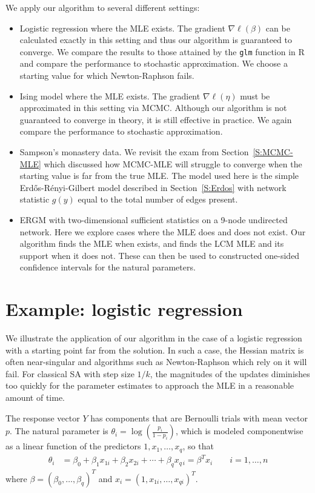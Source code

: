 We apply our algorithm to several different settings:
\begin{itemize}
\item Logistic regression where the MLE exists.  The gradient $\nabla \ell(\beta)$ can be calculated exactly in this setting and thus our algorithm is guaranteed to converge.  We compare the results to those attained by the \texttt{glm} function in R and compare the performance to stochastic approximation.  We choose a starting value for which Newton-Raphson fails.

\item Ising model where the MLE exists.  The gradient $\nabla \ell(\eta)$ must be approximated in this setting via MCMC.  Although our algorithm is not guaranteed to converge in theory, it is still effective in practice.  We again compare the performance to stochastic approximation.

\item Sampson's monastery data.  We revisit the exam from Section~\ref{S:MCMC-MLE} which
discussed how MCMC-MLE will struggle to converge when the starting value is far
from the true MLE.  The model used here is the simple Erd\H{o}s-R\'{e}nyi-Gilbert model 
described in Section~\ref{S:Erdos} with network statistic $g(y)$ equal to the total number of edges present.

\item ERGM with two-dimensional sufficient statistics on a 9-node undirected network.  
Here we explore cases where the MLE does and does not exist.  
Our algorithm finds the MLE when
exists, and finds the LCM MLE and its support when it does not.  These can then
be used to constructed one-sided confidence intervals for the natural parameters.
\end{itemize}

\section{Example: logistic regression}
We illustrate the application of our algorithm in the case of a logistic regression 
with a starting point far from the 
solution.  In such a case, the Hessian matrix is often near-singular and algorithms 
such as Newton-Raphson which rely 
on it will fail.  For classical SA with step size $1/k$, the magnitudes of the updates 
diminishes too quickly for 
the parameter estimates to approach the MLE in a reasonable amount of time.

The response vector $Y$ has components that are Bernoulli trials with mean vector $p$.  
The natural parameter is $
\theta_i = \log \left( \frac{p_i}{1-p_i} \right )$, which is modeled componentwise as 
a linear function of the 
predictors $1, x_1, \ldots, x_{q}$, so that
\begin{align*}
	\theta_i &= \beta_0 + \beta_1 x_{1i} + \beta_2 x_{2i} + \cdots + \beta_{q} x_{q
\,i} = \beta^T x_i \qquad
i = 1, \ldots, n
\end{align*}
where $\beta = (\beta_0, \ldots, \beta_{q} )^T$ and $x_i = ( 1, x_{1i}, \ldots, x_{q 
i})^T$.  

